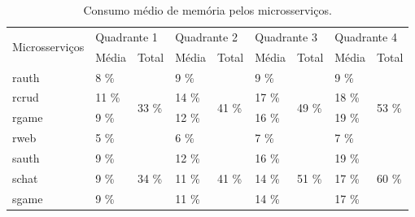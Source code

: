 \begin{table}[htb!]
\centering
\begin{adjustbox}{max width=\textwidth}
\caption{Consumo médio de memória pelos microsserviços.}
\label{tab:mem_gs_media}

\begin{tabular}{l|l|l|l|l|l|l|l|l}
\hline
\hline
\multirow{2}{*}{Microsserviços} & \multicolumn{2}{l|}{Quadrante 1} & \multicolumn{2}{l|}{Quadrante 2} & \multicolumn{2}{l|}{Quadrante 3} & \multicolumn{2}{l}{Quadrante 4} \\ \cline{2-9} 
                                & Média  & Total                   & Média  & Total                   & Média  & Total                   & Média  & Total                   \\ \hline \hline
rauth                           & 8 \%   & \multirow{4}{*}{33 \%}  & 9 \%   & \multirow{4}{*}{41 \%}  & 9 \%   & \multirow{4}{*}{49 \%}  & 9 \%   & \multirow{4}{*}{53 \%}  \\ \cline{1-2} \cline{4-4} \cline{6-6} \cline{8-8}
rcrud                           & 11 \%  &                         & 14 \%  &                         & 17 \%  &                         & 18 \%  &                         \\ \cline{1-2} \cline{4-4} \cline{6-6} \cline{8-8}
rgame                           & 9 \%   &                         & 12 \%  &                         & 16 \%  &                         & 19 \%  &                         \\ \cline{1-2} \cline{4-4} \cline{6-6} \cline{8-8}
rweb                            & 5 \%   &                         & 6 \%   &                         & 7 \%   &                         & 7 \%   &                         \\ \hline \hline
sauth                           & 9 \%   & \multirow{4}{*}{34 \%}  & 12 \%  & \multirow{4}{*}{41 \%}  & 16 \%  & \multirow{4}{*}{51 \%}  & 19 \%  & \multirow{4}{*}{60 \%}  \\ \cline{1-2} \cline{4-4} \cline{6-6} \cline{8-8}
schat                           & 9 \%   &                         & 11 \%  &                         & 14 \%  &                         & 17 \%  &                         \\ \cline{1-2} \cline{4-4} \cline{6-6} \cline{8-8}
sgame                           & 9 \%   &                         & 11 \%  &                         & 14 \%  &                         & 17 \%  &                         \\ \cline{1-2} \cline{4-4} \cline{6-6} \cline{8-8}

\end{tabular}
\end{adjustbox}
\end{table}
